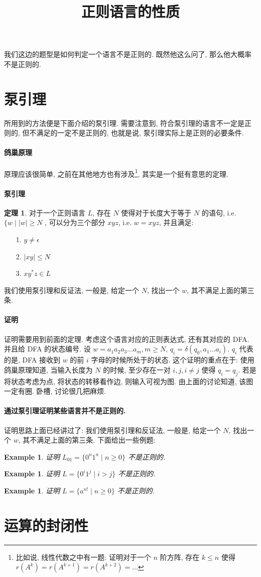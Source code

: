 \documentclass[12pt]{ctexart}
\theoremstyle{definition}
\theoremstyle{definition}
\newtheorem{thm}[definition]{定理}
\theoremstyle{plain}
\newtheorem{exam}[definition]{Example}
\begin{document}
\title{正则语言的性质}
我们这边的题型是如何判定一个语言不是正则的. 既然他这么问了, 那么他大概率不是正则的. 
\section{泵引理}\label{sec:beng}
所用到的方法便是下面介绍的泵引理. 需要注意到, 符合泵引理的语言不一定是正则的, 但不满足的一定不是正则的, 也就是说, 泵引理实际上是正则的必要条件. 
\paragraph{鸽巢原理}
原理应该很简单, 之前在其他地方也有涉及\footnote{比如说, 线性代数之中有一题: 证明对于一个 \(n\) 阶方阵, 存在 \(k \le n\) 使得 \(r (A ^{k} )= r (A ^{k + 1} ) = r (A ^{k + 2} ) = \dots\)}, 其实是一个挺有意思的定理. 

\paragraph{泵引理}
\begin{thm}
对于一个正则语言 \(L\), 存在 \(N\) 使得对于长度大于等于 \(N\) 的语句, i.e. \(\{ w \mid |w | \ge N\) , 可以分为三个部分 \(xyz\), i.e. \(w = xyz\), 并且满足: 
\begin{itemize}
\item [1.] \(y \ne \epsilon\) 
\item [2.] \(|xy | \le N\)
\item [3.] \(x y^{*} z \in L\) 
\end{itemize}
\end{thm}
我们使用泵引理和反证法, 一般是, 给定一个 \(N\), 找出一个 \(w\), 其不满足上面的第三条. 
\paragraph{证明}
证明需要用到前面的定理.  考虑这个语言对应的正则表达式, 还有其对应的 DFA. 并且给 DFA 的状态编号. 
设 \(w = a_{1} a_{2} a_{3} \dots a_{m}, m \ge N\), \(q_{i} = \hat{\delta} (q_{0} , a_{1} \dots a_{i})\). \(q_{i}\) 代表的是, DFA 接收到 \(w\) 的前 \(i\) 字母的时候所处于的状态. 这个证明的重点在于: 使用鸽巢原理知道, 当输入长度为 \(N\) 的时候, 至少存在一对 \(i, j , i \ne j\) 使得 \(q_{i} = q_{j}\). 
若是将状态考虑为点, 将状态的转移看作边, 则输入可视为图. 由上面的讨论知道, 该图一定有圈. 卧槽, 讨论很几把麻烦. 
\paragraph{通过泵引理证明某些语言并不是正则的. }
证明思路上面已经讲过了: 
我们使用泵引理和反证法, 一般是, 给定一个 \(N\), 找出一个 \(w\), 其不满足上面的第三条. 下面给出一些例题: 
\begin{exam}
证明 \(L_{01}  = \{ 0 ^{n } 1 ^{n} \mid n \ge 0\}\) 不是正则的. 
\end{exam}
\begin{exam}
证明 \(L = \{ 0 ^{i}  1 ^{j} \mid i > j \} \) 不是正则的. 
\end{exam}
\begin{exam}
证明 \(L = \{ a ^{n !} \mid n \ge 0\}\) 不是正则的. 
\end{exam}

\section{运算的封闭性}\label{sec:feng}
\end{document}
